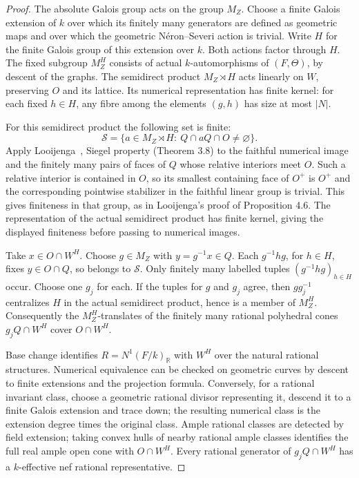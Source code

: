 \documentclass[11pt]{article}
\begin{document}
\begin{proof}
The absolute Galois group acts on the group \(M_Z\). Choose a finite Galois extension of \(k\) over which
its finitely many generators are defined as geometric maps and over which the geometric Néron--Severi
action is trivial. Write \(H\) for the finite Galois group of this extension over \(k\). Both actions
factor through \(H\). The fixed subgroup \(M_Z^H\) consists of actual \(k\)-automorphisms of
\((F,\Theta)\), by descent of the graphs. The semidirect product \(M_Z\rtimes H\) acts linearly on \(W\),
preserving \(O\) and its lattice. Its numerical representation has finite kernel: for each fixed \(h\in
H\), any fibre among the elements \((g,h)\) has size at most \(|N|\).

For this semidirect product the following set is finite: \[
  \mathcal S=\{a\in M_Z\rtimes H:\ Q\cap aQ\cap O\ne\varnothing\}.
\] Apply Looijenga~\cite{Looijenga}, Siegel property (Theorem 3.8) to the faithful numerical image and the finitely many pairs of faces of \(Q\) whose relative interiors meet \(O\). Such a relative interior is contained in \(O\), so its smallest containing face of \(O^+\) is \(O^+\) and the corresponding pointwise stabilizer in the faithful linear group is trivial. This gives finiteness in that group, as in Looijenga's proof of Proposition 4.6. The representation of the actual semidirect product has finite kernel, giving the displayed finiteness before passing to numerical images.

Take \(x\in O\cap W^H\). Choose \(g\in M_Z\) with \(y=g^{-1}x\in Q\). Each \(g^{-1}hg\), for \(h\in H\),
fixes \(y\in O\cap Q\), so belongs to \(\mathcal S\). Only finitely many labelled tuples
\((g^{-1}hg)_{h\in H}\) occur. Choose one \(g_j\) for each. If the tuples for \(g\) and \(g_j\) agree,
then \(g g_j^{-1}\) centralizes \(H\) in the actual semidirect product, hence is a member of \(M_Z^H\).
Consequently the \(M_Z^H\)-translates of the finitely many rational polyhedral cones \(g_jQ\cap W^H\)
cover \(O\cap W^H\).

Base change identifies \(R=N^1(F/k)_\mathbb R\) with \(W^H\) over the natural rational structures.
Numerical equivalence can be checked on geometric curves by descent to finite extensions and the
projection formula. Conversely, for a rational invariant class, choose a geometric rational divisor
representing it, descend it to a finite Galois extension and trace down; the resulting numerical class is
the extension degree times the original class. Ample rational classes are detected by field extension;
taking convex hulls of nearby rational ample classes identifies the full real ample open cone with
\(O\cap W^H\). Every rational generator of \(g_jQ\cap W^H\) has a \(k\)-effective nef rational
representative.


\end{proof}
\end{document}

